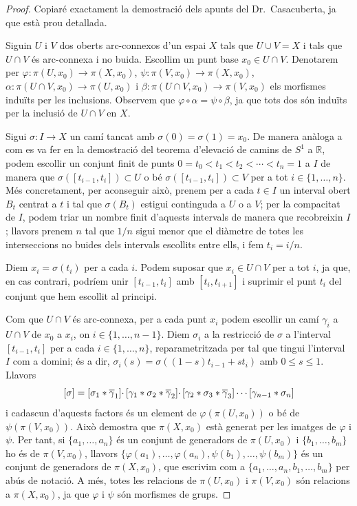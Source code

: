 \documentclass[../main.tex]{subfiles}
\begin{document}
\begin{proof}
Copiaré exactament la demostració dels apunts del Dr.~Casacuberta, ja que està prou detallada.

Siguin $U$ i $V$ dos oberts arc-connexos d'un espai $X$ tals que $U\cup V=X$ i tals que $U\cap V$ és arc-connexa i no buida. Escollim un punt base $x_0\in U\cap V$. Denotarem per $\varphi:\pi(U,x_0)\rightarrow \pi(X,x_0)$, $\psi:\pi(V,x_0)\rightarrow\pi(X,x_0)$, $\alpha:\pi(U\cap V,x_0)\rightarrow \pi(U,x_0)$ i $\beta:\pi(U\cap V,x_0)\rightarrow \pi(V,x_0)$ els morfismes induïts per les inclusions. Observem que $\varphi\circ\alpha = \psi\circ\beta$, ja que tots dos són induïts per la inclusió de $U\cap V$ en $X$.

Sigui $\sigma:I\rightarrow X$ un camí tancat amb $\sigma(0) = \sigma(1) = x_0$. De manera anàloga a com es va fer en la demostració del teorema d'elevació de camins de $S^1$ a $\mathbb{R}$, podem escollir un conjunt finit de punts $0=t_0<t_1<t_2<\cdots<t_n=1$ a $I$ de manera que $\sigma([t_{i-1},t_i])\subset U$ o bé $\sigma([t_{i-1},t_i])\subset V$ per a tot $i\in\{1,\ldots,n\}$. Més concretament, per aconseguir això, prenem per a cada $t\in I$ un interval obert $B_t$ centrat a $t$ i tal que $\sigma(B_t)$ estigui continguda a $U$ o a $V$; per la compacitat de $I$, podem triar un nombre finit d'aquests intervals de manera que recobreixin $I$; llavors prenem $n$ tal que $1/n$ sigui menor que el diàmetre de totes les interseccions no buides dels intervals escollits entre ells, i fem $t_i=i/n$.

Diem $x_i = \sigma(t_i)$ per a cada $i$. Podem suposar que $x_i\in U\cap V$ per a tot $i$, ja que, en cas contrari, podríem unir $[t_{i-1},t_i]$ amb $[t_i,t_{i+1}]$ i suprimir el punt $t_i$ del conjunt que hem escollit al principi.

Com que $U\cap V$ és arc-connexa, per a cada punt $x_i$ podem escollir un camí $\gamma_i$ a $U\cap V$ de $x_0$ a $x_i$, on $i\in\{1,\ldots,n-1\}$. Diem $\sigma_i$ a la restricció de $\sigma$ a l'interval $[t_{i-1},t_i]$ per a cada $i\in \{1,\ldots,n\}$, reparametritzada per tal que tingui l'interval $I$ com a domini; és a dir, $\sigma_i(s) = \sigma((1-s)t_{i-1}+st_i)$ amb $0\leq s\leq 1$. Llavors
\begin{equation}
    \notag
    [\sigma] = [\sigma_1*\overline{\gamma}_1]\cdotp[\gamma_1*\sigma_2*\overline{\gamma}_2]\cdotp[\gamma_2*\sigma_3*\overline{\gamma}_3]\cdots[\gamma_{n-1}*\sigma_n]
\end{equation}
i cadascun d'aquests factors és un element de $\varphi(\pi(U,x_0))$ o bé de $\psi(\pi(V,x_0))$. Això demostra que $\pi(X,x_0)$ està generat per les imatges de $\varphi$ i $\psi$. Per tant, si $\{a_1,\ldots,a_n\}$ és un conjunt de generadors de $\pi(U,x_0)$ i $\{b_1,\ldots,b_m\}$ ho és de $\pi(V,x_0)$, llavors $\{\varphi(a_1),\ldots,\varphi(a_n),\psi(b_1),\ldots,\psi(b_m)\}$ és un conjunt de generadors de $\pi(X,x_0)$, que escrivim com a $\{a_1,\ldots,a_n,b_1,\ldots,b_m\}$ per abús de notació. A més, totes les relacions de $\pi(U,x_0)$ i $\pi(V,x_0)$ són relacions a $\pi(X,x_0)$, ja que $\varphi$ i $\psi$ són morfismes de grups.


\end{proof}
\end{document}
